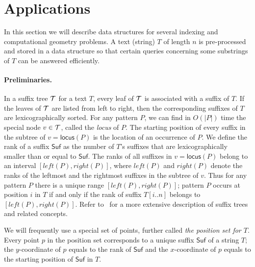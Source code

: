 \documentclass[11pt]{article}
\def\id#1{\ensuremath{\mathit{#1}}}
\let\idit=\id
\def\idsf#1{\ensuremath{\mathsf{#1}}}
\newcommand{\cT}{{\cal T}}
\newcommand{\locus}{\idsf{locus}}
\newcommand{\Suf}{\idsf{Suf}}
\newcommand{\lleft}{\idit{left}}
\newcommand{\rright}{\idit{right}}
\begin{document}
\section{Applications}
\label{sec:appl}
In this section we will describe data structures for several indexing
 and computational geometry problems. A text (string) $T$ of length $n$ 
 is pre-processed and stored in a data structure so that 
certain queries concerning some substrings of $T$ can be answered 
efficiently.
\paragraph{Preliminaries.}
In a suffix tree $\cT$ for a text $T$, every leaf of $\cT$ is associated with a suffix of 
$T$. If the leaves of $\cT$ are listed from left to right, then the 
corresponding suffixes of $T$ are lexicographically sorted. 
For any pattern $P$, we can find in $O(|P|)$ time the special 
node $v\in \cT$, called the \emph{locus} of $P$. 
The starting position of every suffix in the subtree of $v=\locus(P)$ is the 
location of an occurrence of $P$. 
We define the rank of a suffix $\Suf$ as the number of $T$'s suffixes 
that are lexicographically smaller than or equal to $\Suf$.  
The ranks of all suffixes in $v=\locus(P)$ belong to an interval 
$[\lleft(P),\rright(P)]$, where $\lleft(P)$ and $\rright(P)$ denote the ranks 
of the leftmost and the rightmost suffixes in the subtree of $v$. 
Thus for any pattern $P$ there is a unique range $[\lleft(P),\rright(P)]$; 
pattern $P$ occurs at position $i$ in $T$ if and only if 
the rank of suffix $T[i..n]$ belongs to $[\lleft(P),\rright(P)]$.  
Refer to~\cite{Gusfield1997} for a more extensive description of
suffix trees and related concepts. 

We will frequently use a special set of points, further called 
\emph{the position set for $T$}.
Every point $p$ in the position set corresponds to a unique suffix $\Suf$
of a string $T$; 
the $y$-coordinate of $p$ equals to the rank of $\Suf$ and the $x$-coordinate 
of $p$ equals to the starting position of $\Suf$ in $T$. 

  
\end{document}
